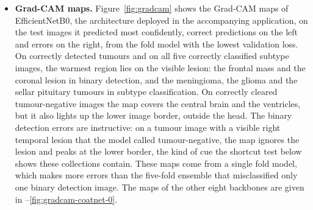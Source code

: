 \documentclass[a4paper,fleqn]{cas-sc}
\begin{document}
\begin{itemize}
\item \textbf{Grad-CAM maps.} Figure~\ref{fig:gradcam} shows the Grad-CAM maps of EfficientNetB0, the architecture deployed in the accompanying application, on the test images it predicted most confidently, correct predictions on the left and errors on the right, from the fold model with the lowest validation loss. On correctly detected tumours and on all five correctly classified subtype images, the warmest region lies on the visible lesion: the frontal mass and the coronal lesion in binary detection, and the meningioma, the glioma and the sellar pituitary tumours in subtype classification. On correctly cleared tumour-negative images the map covers the central brain and the ventricles, but it also lights up the lower image border, outside the head. The binary detection errors are instructive: on a tumour image with a visible right temporal lesion that the model called tumour-negative, the map ignores the lesion and peaks at the lower border, the kind of cue the shortcut test below shows these collections contain. These maps come from a single fold model, which makes more errors than the five-fold ensemble that misclassified only one binary detection image. The maps of the other eight backbones are given in --\ref{fig:gradcam-coatnet-0}.
\end{itemize}

\begin{herefigure}
\centering
{}
\medskip
{}
\caption{Grad-CAM maps of EfficientNetB0, the deployed architecture, on its most confident correct (green titles) and most confident wrong (red titles) test predictions, from the fold with the lowest validation loss. T: true class. P: predicted class and probability.}
\label{fig:gradcam}
\end{herefigure}
\end{document}
